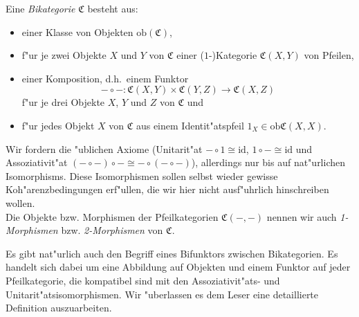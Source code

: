 \begin{Def}
Eine \emph{Bikategorie} $\mathfrak C$ besteht aus:
\begin{itemize}
\item einer Klasse von Objekten $\mathrm{ob}(\mathfrak C)$,
\item f"ur je zwei Objekte $X$ und $Y$ von $\mathfrak C$ einer ($1$-)Kategorie $\mathfrak{C}(X,Y)$ von Pfeilen,
\item einer Komposition, d.h.\ einem Funktor \[-\circ-\colon \mathfrak{C}(X,Y)\times \mathfrak{C}(Y,Z)\longrightarrow\mathfrak{C}(X,Z)\]
f"ur je drei Objekte $X$, $Y$ und $Z$ von $\mathfrak C$ und
\item f"ur jedes Objekt $X$ von $\mathfrak C$ aus einem Identit"atspfeil $1_X\in \mathrm{ob}\mathfrak C(X,X)$.%
\end{itemize}
Wir fordern die "ublichen Axiome (Unitarit"at $-\circ 1\cong \mathrm{id}$, $1\circ -\cong \mathrm{id}$ und Assoziativit"at $(-\circ-)\circ-\cong -\circ(-\circ-)$), allerdings nur bis auf nat"urlichen Isomorphisms. Diese Isomorphismen sollen selbst wieder gewisse Koh"arenzbedingungen erf"ullen, die wir hier nicht ausf"uhrlich hinschreiben wollen.\\
Die Objekte bzw. Morphismen der Pfeilkategorien $\mathfrak C(-,-)$ nennen wir auch \emph{1-Morphismen} bzw. \emph{2-Morphismen} von $\mathfrak C$.
\end{Def}
Es gibt nat"urlich auch den Begriff eines Bifunktors zwischen Bikategorien. Es handelt sich dabei um eine Abbildung auf Objekten und einem Funktor auf jeder Pfeilkategorie, die kompatibel sind mit den Assoziativit"ats- und Unitarit"atsisomorphismen. Wir "uberlassen es dem Leser eine detaillierte Definition auszuarbeiten.

